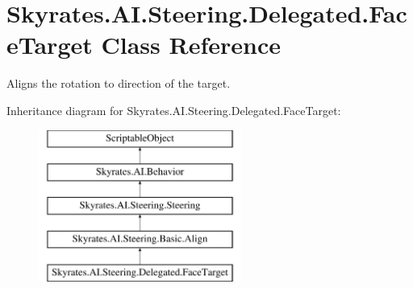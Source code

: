 \hypertarget{class_skyrates_1_1_a_i_1_1_steering_1_1_delegated_1_1_face_target}{\section{Skyrates.\-A\-I.\-Steering.\-Delegated.\-Face\-Target Class Reference}
\label{class_skyrates_1_1_a_i_1_1_steering_1_1_delegated_1_1_face_target}
}


Aligns the rotation to direction of the target.  


Inheritance diagram for Skyrates.\-A\-I.\-Steering.\-Delegated.\-Face\-Target\-:\begin{figure}[H]
\begin{center}
\leavevmode
\includegraphics[height=5.000000cm]{class_skyrates_1_1_a_i_1_1_steering_1_1_delegated_1_1_face_target}
\end{center}
\end{figure}
